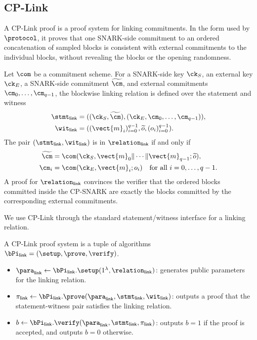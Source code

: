 \subsection{CP-Link}
\label{sec:prelim-cplink}

A CP-Link proof is a proof system for linking commitments.  In the form used by
\(\protocol\), it proves that one SNARK-side commitment to an ordered
concatenation of sampled blocks is consistent with external commitments to the
individual blocks, without revealing the blocks or the opening randomness.

Let $\com$ be a commitment scheme.  For a SNARK-side key \(\ck_S\), an external
key \(\ck_E\), a SNARK-side commitment \(\widetilde{\cm}\), and external
commitments \(\cm_0,\ldots,\cm_{q-1}\), the blockwise linking relation is
defined over the statement and witness
\[
\begin{aligned}
\stmt_{\mathsf{link}}
&=
((\ck_S,\widetilde{\cm}),
(\ck_E,\cm_0,\ldots,\cm_{q-1})),\\
\wit_{\mathsf{link}}
&=
((\vect{m}_i)_{i=0}^{q-1},\widetilde{o},(o_i)_{i=0}^{q-1}).
\end{aligned}
\]
The pair \((\stmt_{\mathsf{link}},\wit_{\mathsf{link}})\) is in
\(\relation_{\mathsf{link}}\) if and only if
\[
\begin{aligned}
\widetilde{\cm}
&=
\com(\ck_S,\vect{m}_0\|\cdots\|\vect{m}_{q-1};\widetilde{o}),\\
\cm_i
&=
\com(\ck_E,\vect{m}_i;o_i)
\quad \text{for all } i=0,\ldots,q-1.
\end{aligned}
\]
A proof for $\relation_{\mathsf{link}}$ convinces the verifier that the ordered
blocks committed inside the CP-SNARK are exactly the blocks committed by the
corresponding external commitments.

We use CP-Link through the standard statement/witness interface for a linking
relation.

A CP-Link proof system is a tuple of algorithms
$\bPi_{\mathsf{link}}=(\setup,\prove,\verify)$.

\begin{itemize}
\item $\para_{\mathsf{link}} \gets
\bPi_{\mathsf{link}}.\setup(1^\lambda,\relation_{\mathsf{link}})$:
generates public parameters for the linking relation.

\item $\pi_{\mathsf{link}} \gets
\bPi_{\mathsf{link}}.\prove(
\para_{\mathsf{link}},
\stmt_{\mathsf{link}},
\wit_{\mathsf{link}})$:
outputs a proof that the statement-witness pair satisfies the linking relation.

\item $b \gets
\bPi_{\mathsf{link}}.\verify(
\para_{\mathsf{link}},
\stmt_{\mathsf{link}},
\pi_{\mathsf{link}})$:
outputs $b=1$ if the proof is accepted, and outputs $b=0$ otherwise.
\end{itemize}

